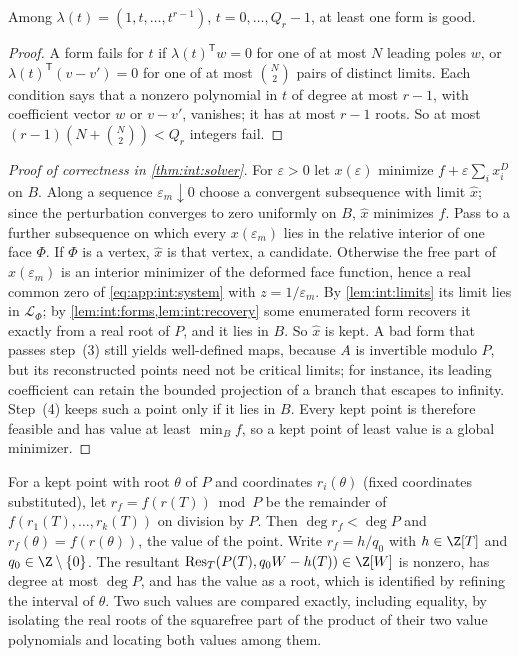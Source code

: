\begin{lemma}\label{lem:int:forms}
Among $\lambda(t)=(1,t,\ldots,t^{r-1})$, $t=0,\ldots,Q_r-1$, at least one form is
good.
\end{lemma}

\begin{proof}
A form fails for $t$ if $\lambda(t)^{\mathsf T}w=0$ for one of at most $N$
leading poles $w$, or $\lambda(t)^{\mathsf T}(v-v')=0$ for one of at most
$\binom N2$ pairs of distinct limits. Each condition says that a nonzero
polynomial in $t$ of degree at most $r-1$, with coefficient vector $w$ or
$v-v'$, vanishes; it has at most $r-1$ roots. So at most
$(r-1)(N+\binom N2)<Q_r$ integers fail.
\end{proof}

\begin{proof}[Proof of correctness in \cref{thm:int:solver}]
For $\varepsilon>0$ let $x(\varepsilon)$ minimize $f+\varepsilon\sum_ix_i^D$ on
$B$. Along a sequence $\varepsilon_m\downarrow0$ choose a convergent subsequence
with limit $\hat x$; since the perturbation converges to zero uniformly on $B$,
$\hat x$ minimizes $f$. Pass to a further subsequence on which every
$x(\varepsilon_m)$ lies in the relative interior of one face $\Phi$. If $\Phi$ is
a vertex, $\hat x$ is that vertex, a candidate. Otherwise the free part of
$x(\varepsilon_m)$ is an interior minimizer of the deformed face function, hence
a real common zero of \eqref{eq:app:int:system} with $z=1/\varepsilon_m$. By
\cref{lem:int:limits} its limit lies in $\mathcal L_\Phi$; by
\cref{lem:int:forms,lem:int:recovery} some enumerated form recovers it exactly
from a real root of $P$, and it lies in $B$. So $\hat x$ is kept. A bad form
that passes step~(3) still yields well-defined maps, because $A$ is invertible
modulo $P$, but its reconstructed points need not be critical limits; for
instance, its leading coefficient can retain the bounded projection of a
branch that escapes to infinity. Step~(4) keeps such a point only if it lies
in $B$. Every kept point is therefore feasible and has value at least
$\min_Bf$, so a kept point of least value is a global minimizer.
\end{proof}

\begin{lemma}\label{lem:int:values}
For a kept point with root $\theta$ of $P$ and coordinates $r_i(\theta)$ (fixed
coordinates substituted), let $r_f=f(r(T))\bmod P$ be the remainder of
$f(r_1(T),\ldots,r_k(T))$ on division by $P$. Then $\deg r_f<\deg P$ and
$r_f(\theta)=f(r(\theta))$, the value of the point. Write $r_f=h/q_0$ with
$h\in\Z[T]$ and $q_0\in\Z\setminus\{0\}$. The resultant
$\operatorname{Res}_T(P(T),q_0W-h(T))\in\Z[W]$ is nonzero, has degree at most
$\deg P$, and has the value as a root, which is identified by refining the
interval of $\theta$. Two such values are compared exactly, including
equality, by isolating the real roots of the squarefree part of the product
of their two value polynomials and locating both values among them.
\end{lemma}


